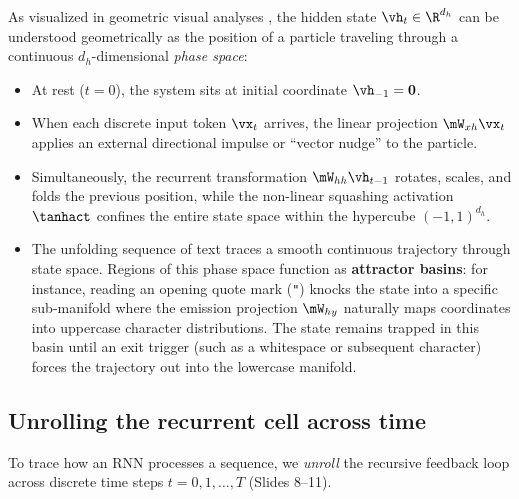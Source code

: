 \documentclass[../../main.tex]{subfiles}
\begin{document}
\begin{intuition}
As visualized in geometric visual analyses \cite{sanderson2024embeddings}, the hidden state $\vh_t \in \R^{d_h}$ can be understood geometrically as the position of a particle traveling through a continuous $d_h$-dimensional \emph{phase space}:
\begin{itemize}
    \item At rest ($t=0$), the system sits at initial coordinate $\vh_{-1} = \mathbf{0}$.
    \item When each discrete input token $\vx_t$ arrives, the linear projection $\mW_{xh} \vx_t$ applies an external directional impulse or ``vector nudge'' to the particle.
    \item Simultaneously, the recurrent transformation $\mW_{hh} \vh_{t-1}$ rotates, scales, and folds the previous position, while the non-linear squashing activation $\tanhact$ confines the entire state space within the hypercube $(-1, 1)^{d_h}$.
    \item The unfolding sequence of text traces a smooth continuous trajectory through state space. Regions of this phase space function as \textbf{attractor basins}: for instance, reading an opening quote mark (\texttt{"}) knocks the state into a specific sub-manifold where the emission projection $\mW_{hy}$ naturally maps coordinates into uppercase character distributions. The state remains trapped in this basin until an exit trigger (such as a whitespace or subsequent character) forces the trajectory out into the lowercase manifold.
\end{itemize}
\end{intuition}

\subsection{Unrolling the recurrent cell across time}
To trace how an RNN processes a sequence, we \emph{unroll} the recursive feedback loop across discrete time steps $t = 0, 1, \dots, T$ (Slides 8--11).
\end{document}

